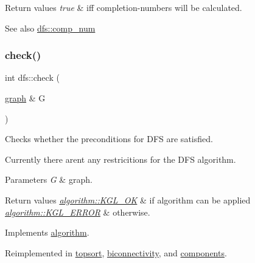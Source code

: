 \begin{DoxyRetVals}{Return values}
{\em true} & iff completion-\/numbers will be calculated. \\
\hline
\end{DoxyRetVals}
\begin{DoxySeeAlso}{See also}
\mbox{\hyperlink{classdfs_aceb066c806cb0beb5688b167a17387c7}{dfs\+::comp\+\_\+num}} 
\end{DoxySeeAlso}
\mbox{\label{classdfs_a1af70060897529e67910f589b047e576}} 
\subsubsection{\texorpdfstring{check()}{check()}}
{\footnotesize\ttfamily int dfs\+::check (\begin{DoxyParamCaption}\item[{\mbox{\hyperlink{classgraph}{graph}} \&}]{G }\end{DoxyParamCaption})\hspace{0.3cm}{\ttfamily [virtual]}}



Checks whether the preconditions for D\+FS are satisfied. 

Currently there aren\textquotesingle{}t any restricitions for the D\+FS algorithm.


\begin{DoxyParams}{Parameters}
{\em G} & graph. \\
\hline
\end{DoxyParams}

\begin{DoxyRetVals}{Return values}
{\em \mbox{\hyperlink{classalgorithm_af1a0078e153aa99c24f9bdf0d97f6710aae4c1cd7fe8d8cf4b143241a6e7c31cf}{algorithm\+::\+K\+G\+L\+\_\+\+OK}}} & if algorithm can be applied \\
\hline
{\em \mbox{\hyperlink{classalgorithm_af1a0078e153aa99c24f9bdf0d97f6710ae67bf27b2ef31f73e545a7f9f4a69556}{algorithm\+::\+K\+G\+L\+\_\+\+E\+R\+R\+OR}}} & otherwise. \\
\hline
\end{DoxyRetVals}


Implements \mbox{\hyperlink{classalgorithm_a76361fb03ad1cf643affc51821e43bed}{algorithm}}.



Reimplemented in \mbox{\hyperlink{classtopsort_a777a9a68c4081d22e7b698ed3c515343}{topsort}}, \mbox{\hyperlink{classbiconnectivity_a65e0e821f5e9ce8d210648d462fd2cfa}{biconnectivity}}, and \mbox{\hyperlink{classcomponents_aeeda901d02c65d6c31c8b6148540d7c1}{components}}.

